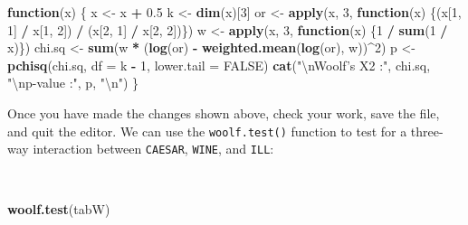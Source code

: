 \documentclass[12pt,a4paper]{book}
\newenvironment{Shaded}{\begin{snugshade}}{\end{snugshade}}
\newcommand{\CharTok}[1]{\textcolor[rgb]{0.31,0.60,0.02}{#1}}
\newcommand{\ControlFlowTok}[1]{\textcolor[rgb]{0.13,0.29,0.53}{\textbf{#1}}}
\newcommand{\DataTypeTok}[1]{\textcolor[rgb]{0.13,0.29,0.53}{#1}}
\newcommand{\DecValTok}[1]{\textcolor[rgb]{0.00,0.00,0.81}{#1}}
\newcommand{\FloatTok}[1]{\textcolor[rgb]{0.00,0.00,0.81}{#1}}
\newcommand{\KeywordTok}[1]{\textcolor[rgb]{0.13,0.29,0.53}{\textbf{#1}}}
\newcommand{\NormalTok}[1]{#1}
\newcommand{\OperatorTok}[1]{\textcolor[rgb]{0.81,0.36,0.00}{\textbf{#1}}}
\newcommand{\OtherTok}[1]{\textcolor[rgb]{0.56,0.35,0.01}{#1}}
\newcommand{\StringTok}[1]{\textcolor[rgb]{0.31,0.60,0.02}{#1}}
\theoremstyle{definition}
\theoremstyle{definition}
\theoremstyle{definition}
\theoremstyle{remark}
\begin{document}
\begin{Shaded}
\begin{Highlighting}[]
\ControlFlowTok{function}\NormalTok{(x) \{}
\NormalTok{  x <-}\StringTok{ }\NormalTok{x }\OperatorTok{+}\StringTok{ }\FloatTok{0.5}
\NormalTok{  k <-}\StringTok{ }\KeywordTok{dim}\NormalTok{(x)[}\DecValTok{3}\NormalTok{]}
\NormalTok{  or <-}\StringTok{ }\KeywordTok{apply}\NormalTok{(x, }\DecValTok{3}\NormalTok{, }\ControlFlowTok{function}\NormalTok{(x)}
\NormalTok{              \{(x[}\DecValTok{1}\NormalTok{, }\DecValTok{1}\NormalTok{] }\OperatorTok{/}\StringTok{ }\NormalTok{x[}\DecValTok{1}\NormalTok{, }\DecValTok{2}\NormalTok{]) }\OperatorTok{/}\StringTok{ }\NormalTok{(x[}\DecValTok{2}\NormalTok{, }\DecValTok{1}\NormalTok{] }\OperatorTok{/}\StringTok{ }\NormalTok{x[}\DecValTok{2}\NormalTok{, }\DecValTok{2}\NormalTok{])\})}
\NormalTok{  w <-}\StringTok{ }\KeywordTok{apply}\NormalTok{(x, }\DecValTok{3}\NormalTok{, }\ControlFlowTok{function}\NormalTok{(x) \{}\DecValTok{1} \OperatorTok{/}\StringTok{ }\KeywordTok{sum}\NormalTok{(}\DecValTok{1} \OperatorTok{/}\StringTok{ }\NormalTok{x)\})}
\NormalTok{  chi.sq <-}\StringTok{ }\KeywordTok{sum}\NormalTok{(w }\OperatorTok{*}\StringTok{ }\NormalTok{(}\KeywordTok{log}\NormalTok{(or) }\OperatorTok{-}\StringTok{ }\KeywordTok{weighted.mean}\NormalTok{(}\KeywordTok{log}\NormalTok{(or), w))}\OperatorTok{^}\DecValTok{2}\NormalTok{)}
\NormalTok{  p <-}\StringTok{ }\KeywordTok{pchisq}\NormalTok{(chi.sq, }\DataTypeTok{df =}\NormalTok{ k }\OperatorTok{-}\StringTok{ }\DecValTok{1}\NormalTok{, }\DataTypeTok{lower.tail =} \OtherTok{FALSE}\NormalTok{)}
  \KeywordTok{cat}\NormalTok{(}\StringTok{"}\CharTok{\textbackslash{}n}\StringTok{Woolf's X2 :"}\NormalTok{, chi.sq,}
      \StringTok{"}\CharTok{\textbackslash{}n}\StringTok{p-value    :"}\NormalTok{, p, }\StringTok{"}\CharTok{\textbackslash{}n}\StringTok{"}\NormalTok{)}
\NormalTok{\}}
\end{Highlighting}
\end{Shaded}

\newpage

Once you have made the changes shown above, check your work, save the
file, and quit the editor. We can use the \texttt{woolf.test()} function
to test for a three-way interaction between \texttt{CAESAR},
\texttt{WINE}, and \texttt{ILL}:

~

\begin{Shaded}
\begin{Highlighting}[]
\KeywordTok{woolf.test}\NormalTok{(tabW)}
\end{Highlighting}
\end{Shaded}
\end{document}
